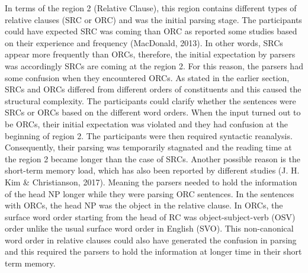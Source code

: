 \documentclass[
]{article}
\begin{document}
In terms of the region 2 (Relative Clause), this region contains
different types of relative clauses (SRC or ORC) and was the initial
parsing stage. The participants could have expected SRC was coming than
ORC as reported some studies based on their experience and frequency
(MacDonald, 2013). In other words, SRCs appear more frequently than
ORCs, therefore, the initial expectation by parsers was accordingly SRCs
are coming at the region 2. For this reason, the parsers had some
confusion when they encountered ORCs. As stated in the earlier section,
SRCs and ORCs differed from different orders of constituents and this
caused the structural complexity. The participants could clarify whether
the sentences were SRCs or ORCs based on the different word orders. When
the input turned out to be ORCs, their initial expectation was violated
and they had confusion at the beginning of region 2. The participants
were then required syntactic reanalysis. Consequently, their parsing was
temporarily stagnated and the reading time at the region 2 became longer
than the case of SRCs. Another possible reason is the short-term memory
load, which has also been reported by different studies (J. H. Kim \&
Christianson, 2017). Meaning the parsers needed to hold the information
of the head NP longer while they were parsing ORC sentences. In the
sentences with ORCs, the head NP was the object in the relative clause.
In ORCs, the surface word order starting from the head of RC was
object-subject-verb (OSV) order unlike the usual surface word order in
English (SVO). This non-canonical word order in relative clauses could
also have generated the confusion in parsing and this required the
parsers to hold the information at longer time in their short term
memory.
\end{document}
